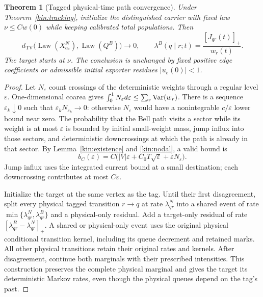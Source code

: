 \documentclass[11pt]{article}
\newtheorem{theorem}{Theorem}[section]
\theoremstyle{definition}\newtheorem{definition}[theorem]{Definition}
\theoremstyle{remark}\newtheorem{remark}[theorem]{Remark}
\newcommand{\Law}{\operatorname{Law}}\newcommand{\TV}{d_{\mathrm{TV}}}
\begin{document}
\begin{theorem}[Tagged physical-time path convergence]\label{kin:path}
Under Theorem~\ref{kin:tracking}, initialize the distinguished carrier
with fixed law $\nu\le Cw(0)$ while keeping calibrated total populations.
Then
\begin{equation}
 \TV\bigl(\Law(X_{a_*}^N),\Law(Q^B)\bigr)\longrightarrow0,
 \qquad \lambda^B(q\mid r;t)=\frac{[J_{qr}(t)]_+}{w_r(t)}.
 \label{kin:Belllimit}
\end{equation}
The target starts at $\nu$. The conclusion is unchanged by fixed positive
edge coefficients or admissible initial exporter residues $|u_e(0)|<1$.
\end{theorem}
\begin{proof}
Let $N_\varepsilon$ count crossings of the deterministic weights through
a regular level $\varepsilon$. One-dimensional coarea gives
$\int_0^1N_\varepsilon d\varepsilon\le\sum_r\operatorname{Var}(w_r)$.
There is a sequence $\varepsilon_k\downarrow0$ such that
$\varepsilon_kN_{\varepsilon_k}\to0$: otherwise $N_\varepsilon$ would
have a nonintegrable $c/\varepsilon$ lower bound near zero.
The probability that the Bell path visits a sector while its weight is
at most $\varepsilon$ is bounded by initial small-weight mass, jump
influx into those sectors, and deterministic downcrossings at which the
path is already in that sector. By Lemma~\ref{kin:existence} and
\eqref{kin:nodal}, a valid bound is
\begin{equation}
 b_C(\varepsilon)=C\bigl(|V|\varepsilon+
 C_0T\sqrt\varepsilon+\varepsilon N_\varepsilon\bigr).
 \label{kin:nodebudget}
\end{equation}
Jump influx uses the integrated current bound at a small destination;
each downcrossing contributes at most $C\varepsilon$.

Initialize the target at the same vertex as the tag. Until their first disagreement, split every physical tagged transition $r\to q$ at rate $\lambda^N_{qr}$ into a shared event of rate $\min\{\lambda^N_{qr},\lambda^B_{qr}\}$ and a physical-only residual. Add a target-only residual of rate $[\lambda^B_{qr}-\lambda^N_{qr}]_+$. A shared or physical-only event uses the original physical conditional transition kernel, including its queue decrement and retained marks. All other physical transitions retain their original rates and kernels. After disagreement, continue both marginals with their prescribed intensities. This construction preserves the complete physical marginal and gives the target its deterministic Markov rates, even though the physical queues depend on the tag's past.


\end{proof}
\end{document}
